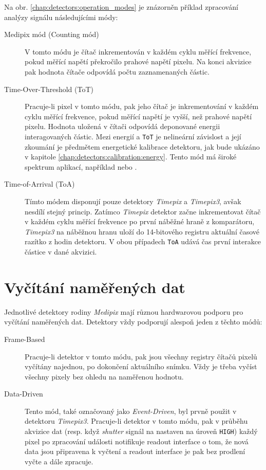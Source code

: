 Na obr. \ref{chap:detectors:operation_modes} je znázorněn příklad zpracování analýzy signálu následujícími módy:
\begin{description}
    \item[Medipix mód (Counting mód)] V tomto módu je čítač inkrementován v každém cyklu měřící frekvence, pokud měřící napětí překročilo prahové napětí pixelu. Na konci akvizice pak hodnota čítače odpovídá počtu zaznamenaných částic.
    \item[Time-Over-Threshold (ToT)] Pracuje-li pixel v tomto módu, pak jeho čítač je inkrementování v každém cyklu měřící frekvence, pokud měřící napětí je vyšší, než prahové napětí pixelu. Hodnota uložená v čítači odpovídá deponované energii interagovaných částic. Mezi energií a \texttt{ToT} je nelineární závislost a její zkoumání je předmětem energetické kalibrace detektoru, jak bude ukázáno v kapitole \ref{chap:detectors:calibration:energy}. Tento mód má široké spektrum aplikací, například \cite{tot_app_counting} nebo \cite{tpx_app_radiotherapy}.
    \item[Time-of-Arrival (ToA)] Tímto módem disponují pouze detektory \textit{Timepix} a \textit{Timepix3}, avšak nesdílí stejný princip. Zatímco \textit{Timepix} detektor začne inkrementovat čítač v každém cyklu měřící frekvence po první náběžné hraně z komparátoru, \textit{Timepix3} na náběžnou hranu uloží do 14-bitového registru aktuální časové razítko z hodin detektoru. V obou případech \texttt{ToA} udává čas první interakce částice v dané akvizici.
\end{description}

\section{Vyčítání naměřených dat}\label{chap:detectors:readout}
Jednotlivé detektory rodiny \textit{Medipix} mají různou hardwarovou podporu pro vyčítání naměřených dat. Detektory vždy podporují alespoň jeden z těchto módů:
\begin{description}
	\item[Frame-Based] Pracuje-li detektor v tomto módu, pak jsou všechny registry čítačů pixelů vyčítány najednou, po dokončení aktuálního snímku. Vždy je třeba vyčíst všechny pixely bez ohledu na naměřenou hodnotu.
	\item[Data-Driven] Tento mód, také označovaný jako \textit{Event-Driven}, byl prvně použit v detektoru \textit{Timepix3}. Pracuje-li detektor v tomto módu, pak v průběhu akvizice dat (resp. když \textit{shutter} signál na nastaven na úroveň \texttt{HIGH}) každý pixel po zpracování události notifikuje readout interface o tom, že nová data jsou připravena k vyčtení a readout interface je pak bez prodlení vyčte a dále zpracuje.
\end{description}

